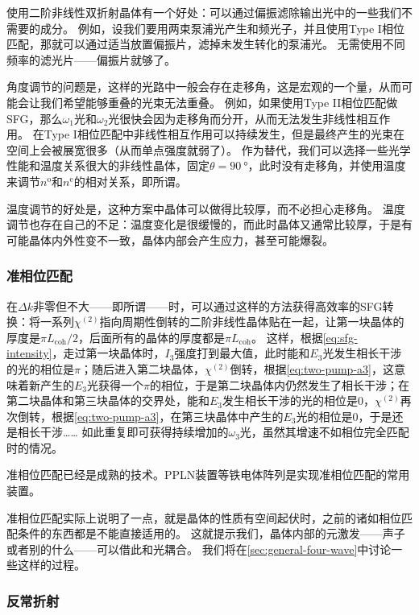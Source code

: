 使用二阶非线性双折射晶体有一个好处：可以通过偏振滤除输出光中的一些我们不需要的成分。
例如，设我们要用两束泵浦光产生和频光子，并且使用Type I相位匹配，那就可以通过适当放置偏振片，滤掉未发生转化的泵浦光。
无需使用不同频率的滤光片——偏振片就够了。

角度调节的问题是，这样的光路中一般会存在走移角，这是宏观的一个量，从而可能会让我们希望能够重叠的光束无法重叠。
例如，如果使用Type II相位匹配做SFG，那么$\omega_1$光和$\omega_2$光很快会因为走移角而分开，从而无法发生非线性相互作用。
在Type I相位匹配中非线性相互作用可以持续发生，但是最终产生的光束在空间上会被展宽很多（从而单点强度就弱了）。
作为替代，我们可以选择一些光学性能和温度关系很大的非线性晶体，固定$\theta = \SI{90}{\degree}$，此时没有走移角，并使用温度来调节$n^\text{o}$和$n^\text{e}$的相对关系，即所谓。

温度调节的好处是，这种方案中晶体可以做得比较厚，而不必担心走移角。
温度调节也存在自己的不足：温度变化是很缓慢的，而此时晶体又通常比较厚，于是有可能晶体内外性变不一致，晶体内部会产生应力，甚至可能爆裂。

\subsubsection{准相位匹配}

在$\Delta k$非零但不大——即所谓——时，可以通过这样的方法获得高效率的SFG转换：将一系列$\chi^{(2)}$指向周期性倒转的二阶非线性晶体贴在一起，让第一块晶体的厚度是$\pi L_\text{coh} / 2$，后面所有的晶体的厚度都是$\pi L_\text{coh}$。
这样，根据\eqref{eq:sfg-intensity}，走过第一块晶体时，$I_3$强度打到最大值，此时能和$E_3$光发生相长干涉的光的相位是$\pi$；随后进入第二块晶体，$\chi^{(2)}$倒转，根据\eqref{eq:two-pump-a3}，这意味着新产生的$E_3$光获得一个$\pi$的相位，于是第二块晶体内仍然发生了相长干涉；在第二块晶体和第三块晶体的交界处，能和$E_3$发生相长干涉的光的相位是$0$，$\chi^{(2)}$再次倒转，根据\eqref{eq:two-pump-a3}，在第三块晶体中产生的$E_3$光的相位是$0$，于是还是相长干涉……
如此重复即可获得持续增加的$\omega_3$光，虽然其增速不如相位完全匹配时的情况。

准相位匹配已经是成熟的技术。PPLN装置等铁电体阵列是实现准相位匹配的常用装置。

准相位匹配实际上说明了一点，就是晶体的性质有空间起伏时，之前的诸如相位匹配条件的东西都是不能直接适用的。
这就提示我们，晶体内部的元激发——声子或者别的什么——可以借此和光耦合。
我们将在\autoref{sec:general-four-wave}中讨论一些这样的过程。

\subsubsection{反常折射}

